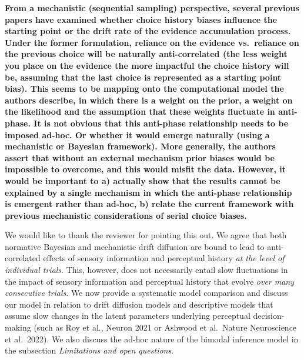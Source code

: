 \documentclass[
]{article}
\begin{document}
\textbf{From a mechanistic (sequential sampling) perspective, several
previous papers have examined whether choice history biases influence
the starting point or the drift rate of the evidence accumulation
process. Under the former formulation, reliance on the evidence
vs.~reliance on the previous choice will be naturally anti-correlated
(the less weight you place on the evidence the more impactful the choice
history will be, assuming that the last choice is represented as a
starting point bias). This seems to be mapping onto the computational
model the authors describe, in which there is a weight on the prior, a
weight on the likelihood and the assumption that these weights fluctuate
in anti-phase. It is not obvious that this anti-phase relationship needs
to be imposed ad-hoc. Or whether it would emerge naturally (using a
mechanistic or Bayesian framework). More generally, the authors assert
that without an external mechanism prior biases would be impossible to
overcome, and this would misfit the data. However, it would be important
to a) actually show that the results cannot be explained by a single
mechanism in which the anti-phase relationship is emergent rather than
ad-hoc, b) relate the current framework with previous mechanistic
considerations of serial choice biases.}

We would like to thank the reviewer for pointing this out. We agree that
both normative Bayesian and mechanistic drift diffusion are bound to
lead to anti-correlated effects of sensory information and perceptual
history \emph{at the level of individual trials}. This, however, does
not necessarily entail slow fluctuations in the impact of sensory
information and perceptual history that evolve \emph{over many
consecutive trials}. We now provide a systematic model comparison and
discuss our model in relation to drift diffusion models and descriptive
models that assume slow changes in the latent parameters underlying
perceptual decision-making (such as Roy et al., Neuron 2021 or Ashwood
et al.~Nature Neuroscience et al.~2022). We also discuss the ad-hoc
nature of the bimodal inference model in the subsection
\emph{Limitations and open questions}.
\end{document}
